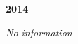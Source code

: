 \begin{center}
  \Huge
  \textbf{2014}
\end{center}

\begin{center}
  \textit{No information}
\end{center}

\vspace{50mm}

\pagebreak
